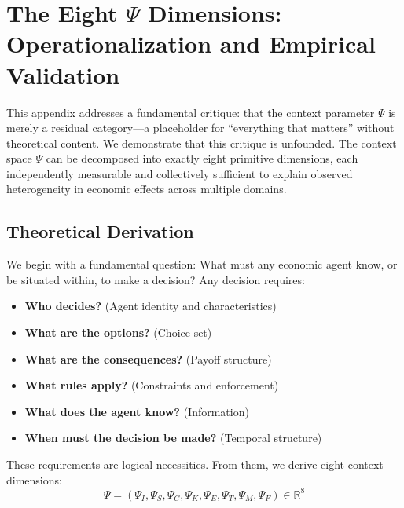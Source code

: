 \section{The Eight $\Psi$ Dimensions: Operationalization and Empirical Validation}
\label{app:psi-dimensions}

This appendix addresses a fundamental critique: that the context parameter $\Psi$ is merely a residual category---a placeholder for ``everything that matters'' without theoretical content. We demonstrate that this critique is unfounded. The context space $\Psi$ can be decomposed into exactly eight primitive dimensions, each independently measurable and collectively sufficient to explain observed heterogeneity in economic effects across multiple domains.

\subsection{Theoretical Derivation}
\label{sec:V-theory}

We begin with a fundamental question: What must any economic agent know, or be situated within, to make a decision? Any decision requires:
\begin{itemize}
    \item \textbf{Who decides?} (Agent identity and characteristics)
    \item \textbf{What are the options?} (Choice set)
    \item \textbf{What are the consequences?} (Payoff structure)
    \item \textbf{What rules apply?} (Constraints and enforcement)
    \item \textbf{What does the agent know?} (Information)
    \item \textbf{When must the decision be made?} (Temporal structure)
\end{itemize}

These requirements are logical necessities. From them, we derive eight context dimensions:
\begin{equation}
\Psi = (\Psi_I, \Psi_S, \Psi_C, \Psi_K, \Psi_E, \Psi_T, \Psi_M, \Psi_F) \in \mathbb{R}^8
\label{eq:psi-vector-appv}
\end{equation}

